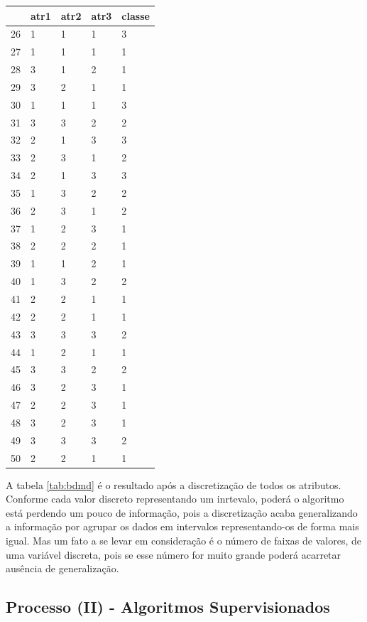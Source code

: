 \begin{table}[!ht]
\begin{tabular}{ |lllll| }
\hline
  & atr1 & atr2 & atr3 & classe \\ \hline
26	&	1	&	1	&	1	&	3	\\	\hline
27	&	1	&	1	&	1	&	1	\\	\hline
28	&	3	&	1	&	2	&	1	\\	\hline
29	&	3	&	2	&	1	&	1	\\	\hline
30	&	1	&	1	&	1	&	3	\\	\hline
31	&	3	&	3	&	2	&	2	\\	\hline
32	&	2	&	1	&	3	&	3	\\	\hline
33	&	2	&	3	&	1	&	2	\\	\hline
34	&	2	&	1	&	3	&	3	\\	\hline
35	&	1	&	3	&	2	&	2	\\	\hline
36	&	2	&	3	&	1	&	2	\\	\hline
37	&	1	&	2	&	3	&	1	\\	\hline
38	&	2	&	2	&	2	&	1	\\	\hline
39	&	1	&	1	&	2	&	1	\\	\hline
40	&	1	&	3	&	2	&	2	\\	\hline
41	&	2	&	2	&	1	&	1	\\	\hline
42	&	2	&	2	&	1	&	1	\\	\hline
43	&	3	&	3	&	3	&	2	\\	\hline
44	&	1	&	2	&	1	&	1	\\	\hline
45	&	3	&	3	&	2	&	2	\\	\hline
46	&	3	&	2	&	3	&	1	\\	\hline
47	&	2	&	2	&	3	&	1	\\	\hline
48	&	3	&	2	&	3	&	1	\\	\hline
49	&	3	&	3	&	3	&	2	\\	\hline
50	&	2	&	2	&	1	&	1	\\	\hline

\end{tabular}
\end{table}

A tabela \ref{tab:bdmd} é o resultado após a discretização de todos os atributos. Conforme cada valor discreto representando um inrtevalo, poderá o algoritmo está perdendo um pouco de informação, pois a discretização acaba generalizando a informação por agrupar os dados em intervalos representando-os de forma mais igual. Mas um fato a se levar em consideração é o número de faixas de valores, de uma variável discreta, pois se esse número for muito grande poderá acarretar ausência de generalização.


\subsection{Processo (II) - Algoritmos Supervisionados}\label{cap:ferramentas:ssec:algsuper}

